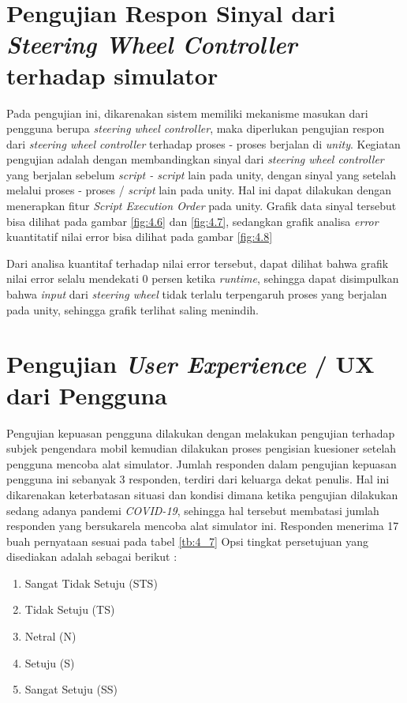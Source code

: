 \section{Pengujian Respon Sinyal dari \textit{Steering Wheel Controller} terhadap simulator}
\vspace{1ex}

Pada pengujian ini, dikarenakan sistem memiliki mekanisme masukan dari pengguna berupa \textit{steering wheel controller}, maka diperlukan pengujian respon dari \textit{steering wheel controller} terhadap proses - proses berjalan di \textit{unity}. Kegiatan pengujian adalah dengan membandingkan sinyal dari \textit{steering wheel controller} yang berjalan sebelum \textit{script - script} lain pada unity, dengan sinyal yang setelah melalui proses - proses / \textit{script} lain pada unity. Hal ini dapat dilakukan dengan menerapkan fitur \textit{Script Execution Order} pada unity.
Grafik data sinyal tersebut bisa dilihat pada gambar \ref{fig:4.6} dan \ref{fig:4.7}, sedangkan grafik analisa \textit{error} kuantitatif nilai error bisa dilihat pada gambar \ref{fig:4.8}
\par Dari analisa kuantitaf terhadap nilai error tersebut, dapat dilihat bahwa grafik nilai error selalu mendekati 0 persen ketika \textit{runtime}, sehingga dapat disimpulkan bahwa \textit{input} dari \textit{steering wheel} tidak terlalu terpengaruh proses yang berjalan pada unity, sehingga grafik terlihat saling menindih.

\section{Pengujian \textit{User Experience} / UX dari Pengguna}
\vspace{1ex}

Pengujian kepuasan pengguna dilakukan dengan melakukan pengujian terhadap subjek pengendara mobil kemudian dilakukan proses pengisian kuesioner setelah pengguna mencoba alat simulator. Jumlah responden dalam pengujian kepuasan pengguna ini sebanyak 3 responden, terdiri dari keluarga dekat penulis. Hal ini dikarenakan keterbatasan situasi dan kondisi dimana ketika pengujian dilakukan sedang adanya pandemi \textit{COVID-19}, sehingga hal tersebut membatasi jumlah responden yang bersukarela mencoba alat simulator ini. Responden menerima 17 buah pernyataan sesuai pada tabel \ref{tb:4_7} Opsi tingkat persetujuan yang disediakan adalah sebagai berikut :

    \begin{enumerate}[nolistsep]
	\item Sangat Tidak Setuju (STS)
	\item Tidak Setuju (TS)
	\item Netral (N)
	\item Setuju (S)
	\item Sangat Setuju (SS)
	
	\vspace{1ex}
\end{enumerate}

